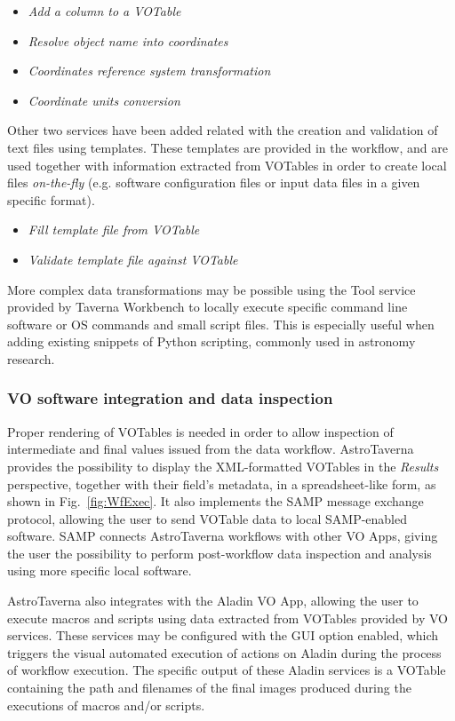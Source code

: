 \documentclass{aa}
\begin{document}
\begin{itemize}
\item \textit{Add a column to a VOTable}
\item \textit{Resolve object name into coordinates} 
\item \textit{Coordinates reference system transformation}
\item \textit{Coordinate units conversion}
\end{itemize}

Other two services have been added related with the creation and validation of text files using templates. These templates are provided in the workflow, and are used together with information extracted from VOTables in order to create local files \textit{on-the-fly} (e.g. software configuration files or input data files in a given specific format).

\begin{itemize}
\item \textit{Fill template file from VOTable}
\item \textit{Validate template file against VOTable}
\end{itemize}

More complex data transformations may be possible using the Tool service provided by Taverna Workbench to locally execute specific command line software or OS commands and small script files. This is especially useful when adding existing snippets of Python scripting, commonly used in astronomy research.  

\subsubsection{VO software integration and data inspection}
\label{VOApps}

Proper rendering of VOTables is needed in order to allow inspection of intermediate and final values issued from the data workflow. AstroTaverna provides the possibility to display the XML-formatted VOTables in the \emph{Results} perspective, together with their field’s metadata, in a spreadsheet-like form, as shown in Fig.~\ref{fig:WfExec}. It also implements the SAMP message exchange protocol, allowing the user to send VOTable data to local SAMP-enabled software. SAMP connects AstroTaverna workflows with other VO Apps, giving the user the possibility to perform post-workflow data inspection and analysis using more specific local software.

AstroTaverna also integrates with the Aladin VO App, allowing the user to execute macros and scripts using data extracted from VOTables provided by VO services. These services may be configured with the GUI option enabled, which triggers the visual automated execution of actions on Aladin during the process of workflow execution. The specific output of these Aladin services is a VOTable containing the path and filenames of the final images produced during the executions of macros and/or scripts.  
\end{document}
